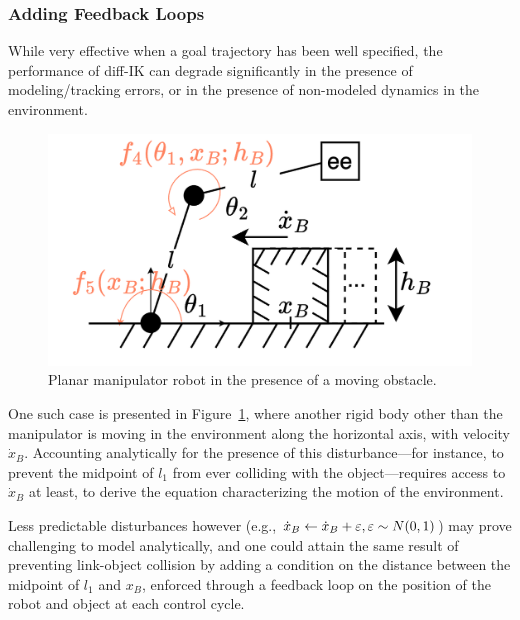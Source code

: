 \subsubsection{Adding Feedback Loops}
While very effective when a goal trajectory has been well specified, the performance of diff-IK can degrade significantly in the presence of modeling/tracking errors, or in the presence of non-modeled dynamics in the environment.

\begin{figure}
    \vspace{-\intextsep}
    \centering
    \includegraphics[width=\linewidth]{figures/ch2/ch2-planar-manipulator-floor-box.png}
    \caption{Planar manipulator robot in the presence of a moving obstacle.}
    \label{fig:planar-manipulator-box-velocity}
\end{figure}

One such case is presented in Figure~\ref{fig:planar-manipulator-box-velocity}, where another rigid body other than the manipulator is moving in the environment along the horizontal axis, with velocity \( \dot x_B \).
Accounting analytically for the presence of this disturbance---for instance, to prevent the midpoint of \( l_1 \) from ever colliding with the object---requires access to \( \dot x_B \) at least, to derive the equation characterizing the motion of the environment.

Less predictable disturbances however (e.g., \( \dot x_B \leftarrow \dot x_B + {\varepsilon}, {\varepsilon} \sim N(0,1) \)) may prove challenging to model analytically, and one could attain the same result of preventing link-object collision by adding a condition on the distance between the midpoint of \( l_1 \) and \( x_B \), enforced through a feedback loop on the position of the robot and object at each control cycle.

